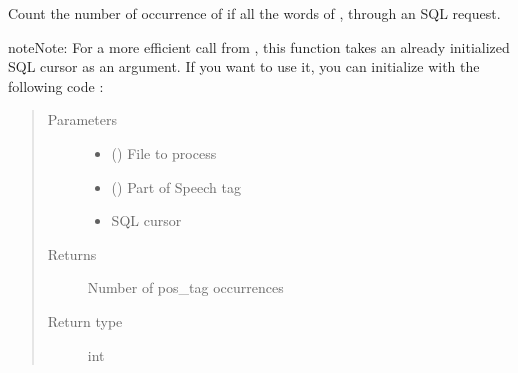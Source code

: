\documentclass[letterpaper,10pt,english]{sphinxmanual}
\begin{document}

\begin{fulllineitems}
\label{\detokenize{analysis:loacore.analysis.frequencies.count_pos_tag}}
Count the number of occurrence of  if all the words of , through an SQL request.

\begin{sphinxadmonition}{note}{Note:}
For a more efficient call from {\hyperref[\detokenize{analysis:loacore.analysis.frequencies.pos_tag_frequencies}]{}}, this function takes an already initialized SQL
cursor as an argument.
If you want to use it, you can initialize  with the following code :

%
\begin{sphinxVerbatim}[commandchars=\\\{\}]
   
   
  
  
\end{sphinxVerbatim}
\end{sphinxadmonition}
\begin{quote}\begin{description}
\item[{Parameters}] \leavevmode\begin{itemize}
\item {} 
 ({\hyperref[\detokenize{classes:loacore.classes.classes.File}]{}}) \textendash{} File to process

\item {} 
 () \textendash{} Part of Speech tag

\item {} 
 \textendash{} SQL cursor

\end{itemize}

\item[{Returns}] \leavevmode
Number of pos\_tag occurrences

\item[{Return type}] \leavevmode
int

\end{description}\end{quote}

\end{fulllineitems}
\end{document}
